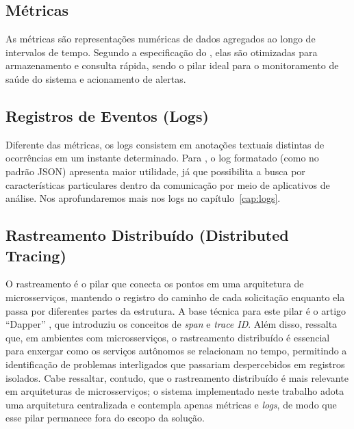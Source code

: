 \documentclass[
    12pt
    ,oneside
    ,a4paper
    ,chapter=TITLE
    ,section=TITLE
    ,sumario=abnt-6027-2012]{abntex2}
\begin{document}
\subsection{Métricas}

As métricas são representações numéricas de dados agregados ao longo de intervalos de tempo. Segundo a especificação do , elas são otimizadas para armazenamento e consulta rápida, sendo o pilar ideal para o monitoramento de saúde do sistema e acionamento de alertas.

\subsection{Registros de Eventos (Logs)}

Diferente das métricas, os logs consistem em anotações textuais distintas de ocorrências em um instante determinado. Para , o log formatado (como no padrão JSON) apresenta maior utilidade, já que possibilita a busca por características particulares dentro da comunicação por meio de aplicativos de análise. Nos aprofundaremos mais nos logs no capítulo~\ref{cap:logs}.

\subsection{Rastreamento Distribuído (Distributed Tracing)}

O rastreamento é o pilar que conecta os pontos em uma arquitetura de microsserviços, mantendo o registro do caminho de cada solicitação enquanto ela passa por diferentes partes da estrutura. A base técnica para este pilar é o artigo ``Dapper'' \cite{sigelman2010dapper}, que introduziu os conceitos de \textit{span} e \textit{trace ID}. Além disso,  ressalta que, em ambientes com microsserviços, o rastreamento distribuído é essencial para enxergar como os serviços autônomos se relacionam no tempo, permitindo a identificação de problemas interligados que passariam despercebidos em registros isolados. Cabe ressaltar, contudo, que o rastreamento distribuído é mais relevante em arquiteturas de microsserviços; o sistema implementado neste trabalho adota uma arquitetura centralizada e contempla apenas métricas e \textit{logs}, de modo que esse pilar permanece fora do escopo da solução.

\end{document}
